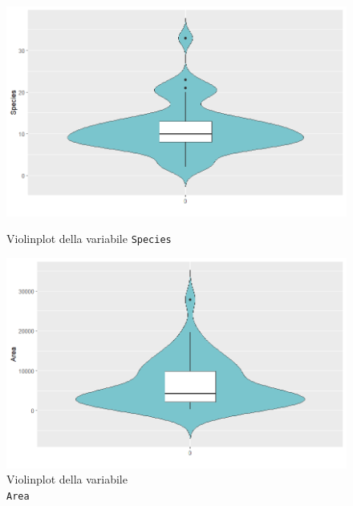 \documentclass{article} %
\begin{document}

\begin{figure}[H]
    \centering
    \begin{minipage}{0.49\textwidth}
        \centering
        \includegraphics[width=\textwidth]{immagini/vp_species.png}
        \captionsetup{justification=centering}
        \caption{Violinplot della variabile \texttt{Species}}
    \end{minipage}
    \hfill
    \begin{minipage}{0.49\textwidth}
        \centering
        \includegraphics[width=\textwidth]{immagini/vp_area.png}
        \captionsetup{justification=centering}
        \caption{Violinplot della variabile\\ \texttt{Area}}
    \end{minipage}
\end{figure}
\end{document}
